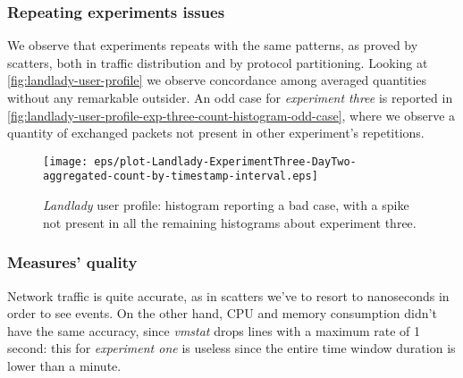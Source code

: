 \documentclass[10pt,a4paper]{article}
\begin{document}

    \subsubsection*{Repeating experiments issues}
    
    We observe that experiments repeats with the same patterns, as
    proved by scatters, both in traffic distribution and by protocol
    partitioning. Looking at \autoref{fig:landlady-user-profile} we
    observe concordance among averaged quantities without any
    remarkable outsider. An odd case for \emph{experiment three} is
    reported in
    \autoref{fig:landlady-user-profile-exp-three-count-histogram-odd-case},
    where we observe a quantity of exchanged packets not present in
    other experiment's repetitions.

    \begin{figure}
      \centering
      \texttt{[image: eps/plot-Landlady-ExperimentThree-DayTwo-aggregated-count-by-timestamp-interval.eps]}
      \caption{\emph{Landlady} user profile: histogram reporting a bad
        case, with a spike not present in all the remaining histograms
        about experiment three.}
      \label{fig:landlady-user-profile-exp-three-count-histogram-odd-case}
    \end{figure}



    \subsubsection*{Measures' quality}
    Network traffic is quite accurate, as in scatters we've to resort
    to nanoseconds in order to see events. On the other hand, CPU and
    memory consumption didn't have the same accuracy, since
    \emph{vmstat} drops lines with a maximum rate of 1 second: this
    for \emph{experiment one} is useless since the entire time window
    duration is lower than a minute.
  
\end{document}
